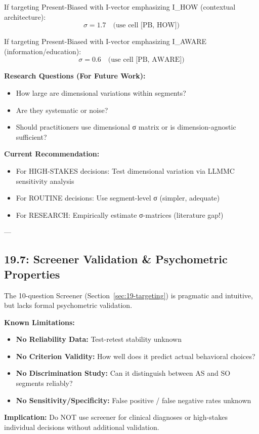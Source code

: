 If targeting Present-Biased with I-vector emphasizing I_HOW (contextual architecture):
\begin{equation}
\sigma = 1.7 \quad \text{(use cell [PB, HOW])}
\end{equation}

If targeting Present-Biased with I-vector emphasizing I_AWARE (information/education):
\begin{equation}
\sigma = 0.6 \quad \text{(use cell [PB, AWARE])}
\end{equation}

\textbf{Research Questions (For Future Work):}
\begin{itemize}[nosep]
\item How large are dimensional variations within segments?
\item Are they systematic or noise?
\item Should practitioners use dimensional σ matrix or is dimension-agnostic sufficient?
\end{itemize}

\textbf{Current Recommendation:}
\begin{itemize}[nosep]
\item For HIGH-STAKES decisions: Test dimensional variation via LLMMC sensitivity analysis
\item For ROUTINE decisions: Use segment-level σ (simpler, adequate)
\item For RESEARCH: Empirically estimate σ-matrices (literature gap!)
\end{itemize}

---

\subsection{19.7: Screener Validation \& Psychometric Properties}
\label{subsec:19-screener-validation}

\begin{tcolorbox}[colback=red!5!white, colframe=red!75!black, title=\textbf{Limitation Disclosure: The Screener has NOT been formally validated}]

The 10-question Screener (Section~\ref{sec:19-targeting}) is pragmatic and intuitive, but lacks formal psychometric validation.

\textbf{Known Limitations:}
\begin{itemize}[nosep]
\item \textbf{No Reliability Data:} Test-retest stability unknown
\item \textbf{No Criterion Validity:} How well does it predict actual behavioral choices?
\item \textbf{No Discrimination Study:} Can it distinguish between AS and SO segments reliably?
\item \textbf{No Sensitivity/Specificity:} False positive / false negative rates unknown
\end{itemize}

\textbf{Implication:} Do NOT use screener for clinical diagnoses or high-stakes individual decisions without additional validation.

\end{tcolorbox}


